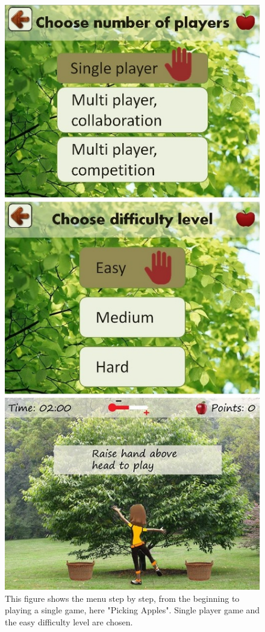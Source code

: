 \begin{figure} [H]
\centering
\includegraphics[scale=0.45]{menuEnglishStep2.jpg}
\caption[Menu review - part two]{This figure shows the menu step by step, from the beginning to playing a single game, here "Picking Apples". Single player game and the easy difficulty level are chosen.}
\label{menu2}
\end{figure}

